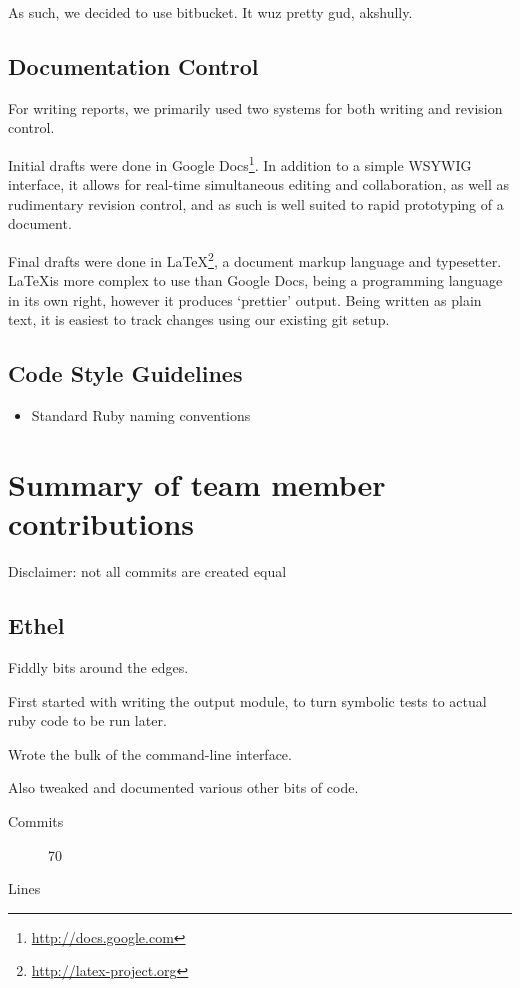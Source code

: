       As such, we decided to use bitbucket.
      It wuz pretty gud, akshully.

    \subsection{Documentation Control}
      For writing reports, we primarily used two systems for both writing and revision control.

      Initial drafts were done in Google Docs\footnote{\url{http://docs.google.com}}.
      In addition to a simple WSYWIG interface, it allows for real-time simultaneous editing and collaboration, as well as rudimentary revision control, and as such is well suited to rapid prototyping of a document.

      Final drafts were done in \LaTeX\footnote{\url{http://latex-project.org}}, a document markup language and typesetter.
      \LaTeX is more complex to use than Google Docs, being a programming language in its own right, however it produces `prettier' output.
      Being written as plain text, it is easiest to track changes using our existing git setup.

  \subsection{Code Style Guidelines}
    \begin{itemize}
      \item Standard Ruby naming conventions
    \end{itemize}


\section{Summary of team member contributions}
Disclaimer: not all commits are created equal

  \subsection{Ethel}
    Fiddly bits around the edges.

    First started with writing the output module, to turn symbolic tests to actual ruby code to be run later.

    Wrote the bulk of the command-line interface.

    Also tweaked and documented various other bits of code.
    \begin{description}
      \item[Commits] 70
      \item[Lines]
    \end{description}


